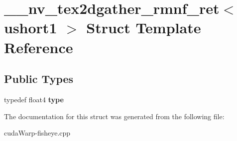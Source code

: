 \hypertarget{struct____nv__tex2dgather__rmnf__ret_3_01ushort1_01_4}{}\section{\+\_\+\+\_\+nv\+\_\+tex2dgather\+\_\+rmnf\+\_\+ret$<$ ushort1 $>$ Struct Template Reference}
\label{struct____nv__tex2dgather__rmnf__ret_3_01ushort1_01_4}
\subsection*{Public Types}
\begin{DoxyCompactItemize}
\item 
typedef float4 {\bfseries type}\hypertarget{struct____nv__tex2dgather__rmnf__ret_3_01ushort1_01_4_a53b740cf095a5dfba250067f49245506}{}\label{struct____nv__tex2dgather__rmnf__ret_3_01ushort1_01_4_a53b740cf095a5dfba250067f49245506}

\end{DoxyCompactItemize}


The documentation for this struct was generated from the following file\+:\begin{DoxyCompactItemize}
\item 
cuda\+Warp-\/fisheye.\+cpp\end{DoxyCompactItemize}

